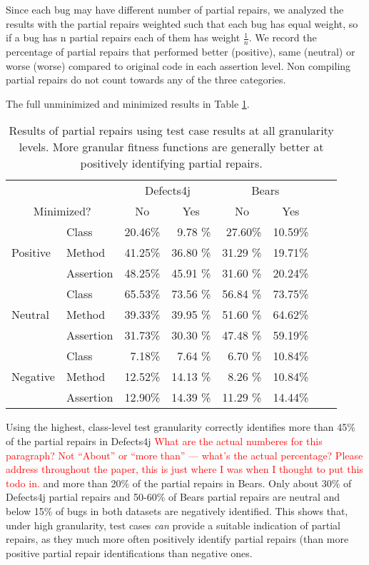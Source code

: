 \documentclass[sigconf, timestamp-false, anonymous=true]{acmart}
\newcommand\todo[1]{\textcolor{red}{#1}}
\begin{document}
Since each bug may have different 
number of partial repairs, we analyzed the results with the partial repairs weighted such that each bug
has equal weight, so if a bug has n partial repairs each of them has weight 
$\frac{1}{n}$. We record the percentage of partial repairs that performed better (positive), same (neutral)
or worse (worse) compared to original code in each assertion level. Non compiling
partial repairs do not count towards any of the three categories.

The full unminimized and minimized results in Table \ref{yiweitable}.


\begin{table}
{\begin{center}
\begin{tabular}{ll|rr|rrrr}
\toprule
\multicolumn{2}{c}{}&\multicolumn{2}{c}{Defects4j} & \multicolumn{2}{c}{Bears} \\
\multicolumn{2}{c}{Minimized?} & \multicolumn{1}{c}{No} & \multicolumn{1}{c}{Yes} & \multicolumn{1}{c}{No} & \multicolumn{1}{c}{Yes}  \\
\midrule
\multirow{3}{*}{Positive} & Class & 20.46\% & 9.78 \% & 27.60\% & 10.59\%  \\
 & Method & 41.25\% & 36.80 \% & 31.29 \% & 19.71\%  \\
 & Assertion & 48.25\% & 45.91 \% & 31.60 \% & 20.24\%  \\ 
\midrule
\multirow{3}{*}{Neutral} & Class & 65.53\% & 73.56 \% & 56.84 \% & 73.75\% \\
 & Method & 39.33\% & 39.95 \% & 51.60 \% & 64.62\%  \\
 & Assertion & 31.73\% & 30.30 \% & 47.48 \% &  59.19\%  \\ 
\midrule
\multirow{3}{*}{Negative} & Class & 7.18\% & 7.64 \% & 6.70 \% & 10.84\%  \\
 & Method & 12.52\% & 14.13 \% & 8.26 \% & 10.84\%  \\
 & Assertion & 12.90\% & 14.39 \% & 11.29 \% &  14.44\%  \\ 
\bottomrule
\end{tabular}
\end{center}}
\caption{Results of partial repairs using test case results
at all granularity levels.
More granular fitness functions are generally better at positively identifying partial repairs.}
\label{yiweitable}
\end{table}


Using the highest, class-level test granularity correctly identifies more than
45\% of the partial repairs in Defects4j \todo{What are the actual numberes for
  this paragraph? Not ``About'' or ``more than'' --- what's the actual
  percentage?  Please address throughout the paper, this is just where I was
  when I thought to put this todo in.}
and more than 20\% of the partial repairs in Bears. Only about 30\% of Defects4j partial repairs and 50-60\%
of Bears partial repairs are neutral and below 15\% of bugs in both datasets are negatively identified. This shows that, 
under high granularity, test cases \emph{can} provide a suitable
indication of partial repairs, as they much more often positively identify
partial repairs (than 
more positive partial repair identifications than negative ones.
 
\end{document}
